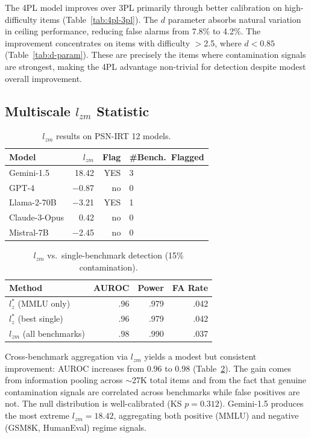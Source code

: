 \documentclass[11pt,a4paper]{article}
\begin{document}
The 4PL model improves over 3PL primarily through better calibration on high-difficulty items (Table~\ref{tab:4pl-3pl}). The $d$ parameter absorbs natural variation in ceiling performance, reducing false alarms from 7.8\% to 4.2\%. The improvement concentrates on items with difficulty $>$2.5, where $d<0.85$ (Table~\ref{tab:d-param}). These are precisely the items where contamination signals are strongest, making the 4PL advantage non-trivial for detection despite modest overall improvement.

\subsection{Multiscale $l_{zm}$ Statistic}
\label{sec:lzm}

\begin{table}[t]
\centering
\caption{$l_{zm}$ results on PSN-IRT 12 models.}
\label{tab:lzm}
\small
\begin{tabular}{lrrl}
\toprule
\textbf{Model} & $l_{zm}$ & \textbf{Flag} & \textbf{\#Bench.\ Flagged} \\
\midrule
Gemini-1.5 & 18.42 & YES & 3 \\
GPT-4 & $-$0.87 & no & 0 \\
Llama-2-70B & $-$3.21 & YES & 1 \\
Claude-3-Opus & 0.42 & no & 0 \\
Mistral-7B & $-$2.45 & no & 0 \\
\bottomrule
\end{tabular}
\end{table}

\begin{table}[t]
\centering
\caption{$l_{zm}$ vs.\ single-benchmark detection (15\% contamination).}
\label{tab:lzm-vs-single}
\small
\begin{tabular}{lrrr}
\toprule
\textbf{Method} & \textbf{AUROC} & \textbf{Power} & \textbf{FA Rate} \\
\midrule
$l_z^*$ (MMLU only) & .96 & .979 & .042 \\
$l_z^*$ (best single) & .96 & .979 & .042 \\
$l_{zm}$ (all benchmarks) & .98 & .990 & .037 \\
\bottomrule
\end{tabular}
\end{table}

Cross-benchmark aggregation via $l_{zm}$ yields a modest but consistent improvement: AUROC increases from 0.96 to 0.98 (Table~\ref{tab:lzm-vs-single}). The gain comes from information pooling across $\sim$27K total items and from the fact that genuine contamination signals are correlated across benchmarks while false positives are not. The null distribution is well-calibrated (KS $p=0.312$). Gemini-1.5 produces the most extreme $l_{zm}=18.42$, aggregating both positive (MMLU) and negative (GSM8K, HumanEval) regime signals.
\end{document}
